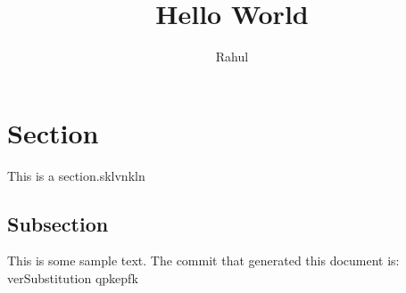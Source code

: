\documentclass[12pt]{article}
\title{Hello World}
\author{Rahul}
\begin{document}
\maketitle

\section{Section}

This is a section.sklvnkln

\subsection{Subsection}

This is some sample text.
The commit that generated this document is: verSubstitution
qpkepfk
\end{document}

